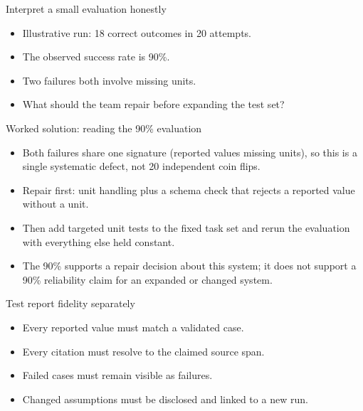 \documentclass[aspectratio=169,11pt]{beamer}
\begin{document}
\begin{frame}[t,fragile]{Interpret a small evaluation honestly}
\fontsize{11.5}{14}\selectfont
\begin{itemize}\setlength{\itemsep}{2mm}
\item Illustrative run: 18 correct outcomes in 20 attempts.
\item The observed success rate is 90\%.
\item Two failures both involve missing units.
\item What should the team repair before expanding the test set?
\end{itemize}
\end{frame}
\begin{frame}[t,fragile]{Worked solution: reading the 90\% evaluation}
\fontsize{11.5}{14}\selectfont
\begin{itemize}\setlength{\itemsep}{2mm}
\item Both failures share one signature (reported values missing units), so this is a single systematic defect, not 20 independent coin flips.
\item Repair first: unit handling plus a schema check that rejects a reported value without a unit.
\item Then add targeted unit tests to the fixed task set and rerun the evaluation with everything else held constant.
\item The 90\% supports a repair decision about this system; it does not support a 90\% reliability claim for an expanded or changed system.
\end{itemize}
\end{frame}
\begin{frame}[t,fragile]{Test report fidelity separately}
\fontsize{11.5}{14}\selectfont
\begin{itemize}\setlength{\itemsep}{2mm}
\item Every reported value must match a validated case.
\item Every citation must resolve to the claimed source span.
\item Failed cases must remain visible as failures.
\item Changed assumptions must be disclosed and linked to a new run.
\end{itemize}
\end{frame}
\end{document}
